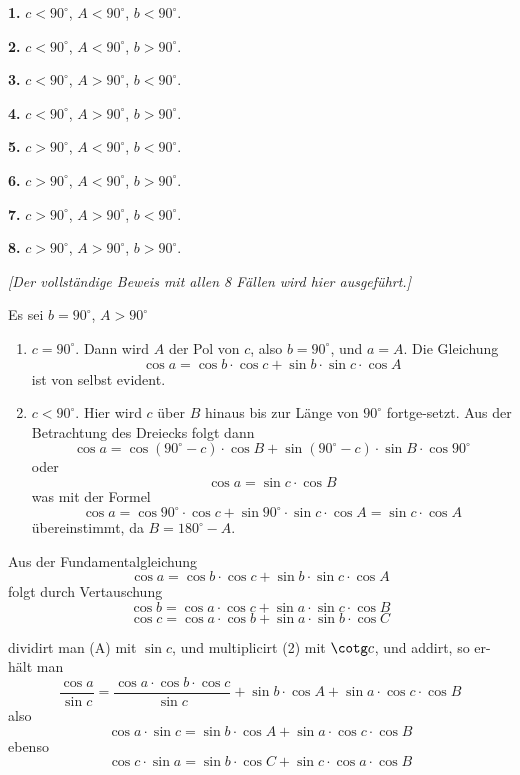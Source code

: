 \documentclass[12pt,a4paper]{article}
\begin{document}
\textbf{1.} $c < 90^\circ$, $A < 90^\circ$, $b < 90^\circ$.

\textbf{2.} $c < 90^\circ$, $A < 90^\circ$, $b > 90^\circ$.

\textbf{3.} $c < 90^\circ$, $A > 90^\circ$, $b < 90^\circ$.

\textbf{4.} $c < 90^\circ$, $A > 90^\circ$, $b > 90^\circ$.

\textbf{5.} $c > 90^\circ$, $A < 90^\circ$, $b < 90^\circ$.

\textbf{6.} $c > 90^\circ$, $A < 90^\circ$, $b > 90^\circ$.

\textbf{7.} $c > 90^\circ$, $A > 90^\circ$, $b < 90^\circ$.

\textbf{8.} $c > 90^\circ$, $A > 90^\circ$, $b > 90^\circ$.

\textit{[Der vollst\"andige Beweis mit allen 8 F\"allen wird hier ausgef\"uhrt.]}

\newpage
Es sei $b = 90^\circ$, $A > 90^\circ$
\begin{enumerate}
\item[$1$)] $c = 90^\circ$. Dann wird $A$ der Pol von $c$, also $b = 90^\circ$, und $a = A$.
Die Gleichung
\[
\cos a = \cos b \cdot \cos c + \sin b \cdot \sin c \cdot \cos A
\]
ist von selbst evident.

\item[$2$)] $c < 90^\circ$. Hier wird $c$ \"uber $B$ hinaus bis zur L\"ange von $90^\circ$ fortge-\/setzt. Aus der Betrachtung des Dreiecks folgt dann
\[
\cos a = \cos(90^\circ-c) \cdot \cos B + \sin(90^\circ-c) \cdot \sin B \cdot \cos 90^\circ
\]
oder
\[
\cos a = \sin c \cdot \cos B
\]
was mit der Formel
\[
\cos a = \cos 90^\circ \cdot \cos c + \sin 90^\circ \cdot \sin c \cdot \cos A = \sin c \cdot \cos A
\]
\"ubereinstimmt, da $B = 180^\circ - A$.
\end{enumerate}

Aus der Fundamentalgleichung
\[
\cos a = \cos b \cdot \cos c + \sin b \cdot \sin c \cdot \cos A \tag{A}
\]
folgt durch Vertauschung
\[
\cos b = \cos a \cdot \cos c + \sin a \cdot \sin c \cdot \cos B \tag{1}
\]
\[
\cos c = \cos a \cdot \cos b + \sin a \cdot \sin b \cdot \cos C \tag{2}
\]

dividirt man (A) mit $\sin c$, und multiplicirt (2) mit $\cotg c$, und addirt, so er-\/h\"alt man
\[
\frac{\cos a}{\sin c} = \frac{\cos a \cdot \cos b \cdot \cos c}{\sin c} + \sin b \cdot \cos A + \sin a \cdot \cos c \cdot \cos B
\]
also
\[
\cos a \cdot \sin c = \sin b \cdot \cos A + \sin a \cdot \cos c \cdot \cos B \tag{3}
\]
ebenso
\[
\cos c \cdot \sin a = \sin b \cdot \cos C + \sin c \cdot \cos a \cdot \cos B \tag{4}
\]
\end{document}
